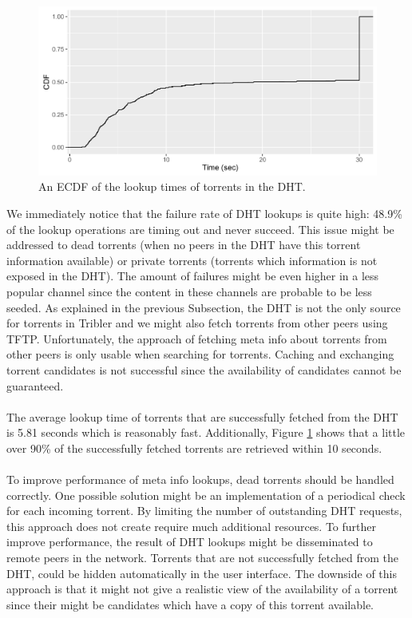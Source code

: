 \begin{figure}[!h]
	\centering
	\includegraphics[width=1.0\columnwidth]{images/experiments/metainfo_fetch}
	\caption{An ECDF of the lookup times of torrents in the DHT.}
	\label{fig:metainfo_fetch}
\end{figure}

We immediately notice that the failure rate of DHT lookups is quite high: 48.9\% of the lookup operations are timing out and never succeed. This issue might be addressed to dead torrents (when no peers in the DHT have this torrent information available) or private torrents (torrents which information is not exposed in the DHT). The amount of failures might be even higher in a less popular channel since the content in these channels are probable to be less seeded. As explained in the previous Subsection, the DHT is not the only source for torrents in Tribler and we might also fetch torrents from other peers using TFTP. Unfortunately, the approach of fetching meta info about torrents from other peers is only usable when searching for torrents. Caching and exchanging torrent candidates is not successful since the availability of candidates cannot be guaranteed.\\\\
The average lookup time of torrents that are successfully fetched from the DHT is 5.81 seconds which is reasonably fast. Additionally, Figure \ref{fig:metainfo_fetch} shows that a little over 90\% of the successfully fetched torrents are retrieved within 10 seconds.\\\\
To improve performance of meta info lookups, dead torrents should be handled correctly. One possible solution might be an implementation of a periodical check for each incoming torrent. By limiting the number of outstanding DHT requests, this approach does not create require much additional resources. To further improve performance, the result of DHT lookups might be disseminated to remote peers in the network. Torrents that are not successfully fetched from the DHT, could be hidden automatically in the user interface. The downside of this approach is that it might not give a realistic view of the availability of a torrent since their might be candidates which have a copy of this torrent available.